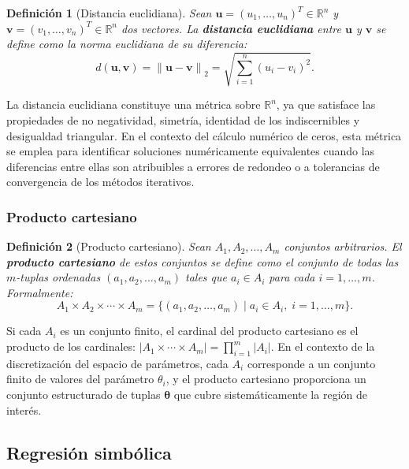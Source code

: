 \documentclass[12pt,a4paper]{article}
\newtheorem{definition}{Definición}
\newcommand{\thetavec}{\boldsymbol{\theta}}
\newcommand{\R}{\mathbb{R}}
\newcommand{\norm}[1]{\left\lVert#1\right\rVert}
\begin{document}
\begin{definition}[Distancia euclidiana]
Sean \(\mathbf{u} = (u_1, \dots, u_n)^T \in \R^n\) y \(\mathbf{v} = (v_1, \dots, v_n)^T \in \R^n\) dos vectores. La \textbf{distancia euclidiana} entre \(\mathbf{u}\) y \(\mathbf{v}\) se define como la norma euclidiana de su diferencia:
\begin{equation}
    d(\mathbf{u}, \mathbf{v}) = \norm{\mathbf{u} - \mathbf{v}}_2 = \sqrt{\sum_{i=1}^{n} (u_i - v_i)^2}.
\end{equation}
\end{definition}

La distancia euclidiana constituye una métrica sobre \(\R^n\), ya que satisface las propiedades de no negatividad, simetría, identidad de los indiscernibles y desigualdad triangular. En el contexto del cálculo numérico de ceros, esta métrica se emplea para identificar soluciones numéricamente equivalentes cuando las diferencias entre ellas son atribuibles a errores de redondeo o a tolerancias de convergencia de los métodos iterativos.

\subsubsection*{Producto cartesiano}

\begin{definition}[Producto cartesiano]
Sean \(A_1, A_2, \dots, A_m\) conjuntos arbitrarios. El \textbf{producto cartesiano} de estos conjuntos se define como el conjunto de todas las \(m\)-tuplas ordenadas \((a_1, a_2, \dots, a_m)\) tales que \(a_i \in A_i\) para cada \(i = 1, \dots, m\). Formalmente:
\begin{equation}
    A_1 \times A_2 \times \cdots \times A_m = \{(a_1, a_2, \dots, a_m) \mid a_i \in A_i,\; i=1,\dots,m\}.
\end{equation}
\end{definition}

Si cada \(A_i\) es un conjunto finito, el cardinal del producto cartesiano es el producto de los cardinales: \(|A_1 \times \cdots \times A_m| = \prod_{i=1}^m |A_i|\). En el contexto de la discretización del espacio de parámetros, cada \(A_i\) corresponde a un conjunto finito de valores del parámetro \(\theta_i\), y el producto cartesiano proporciona un conjunto estructurado de tuplas \(\thetavec\) que cubre sistemáticamente la región de interés.

\subsection*{Regresión simbólica}
\end{document}
